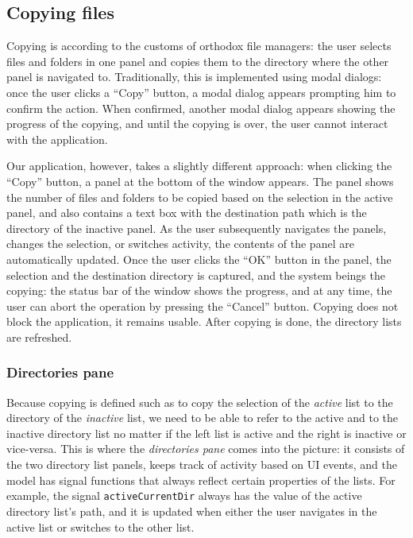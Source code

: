 \subsection{Copying files}

Copying is according to the customs of orthodox file managers: the user selects files and folders in one panel and copies them to the directory where the other panel is navigated to. Traditionally, this is implemented using modal dialogs: once the user clicks a ``Copy'' button, a modal dialog appears prompting him to confirm the action. When confirmed, another modal dialog appears showing the progress of the copying, and until the copying is over, the user cannot interact with the application. 

Our application, however, takes a slightly different approach: when clicking the ``Copy'' button, a panel at the bottom of the window appears. The panel shows the number of files and folders to be copied based on the selection in the active panel, and also contains a text box with the destination path which is the directory of the inactive panel. As the user subsequently navigates the panels, changes the selection, or switches activity, the contents of the panel are automatically updated. Once the user clicks the ``OK'' button in the panel, the selection and the destination directory is captured, and the system beings the copying: the status bar of the window shows the progress, and at any time, the user can abort the operation by pressing the ``Cancel'' button. Copying does not block the application, it remains usable. After copying is done, the directory lists are refreshed.

\subsubsection{Directories pane}

Because copying is defined such as to copy the selection of the \emph{active} list to the directory of the \emph{inactive} list, we need to be able to refer to the active and to the inactive directory list no matter if the left list is active and the right is inactive or vice-versa. This is where the \emph{directories pane} comes into the picture: it consists of the two directory list panels, keeps track of activity based on UI events, and the model has signal functions that always reflect certain properties of the lists. For example, the signal \texttt{activeCurrentDir} always has the value of the active directory list's path, and it is updated when either the user navigates in the active list or switches to the other list.

